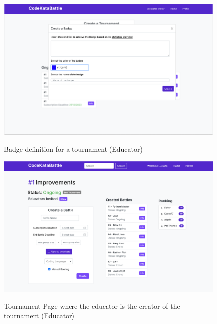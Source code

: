 \documentclass{Configuration_Files/Template}
\begin{document}
\begin{figure}[H]
\centering
\includegraphics[scale = 0.25]{Images/UI/MainPageEducator-1.png}\\
\caption{Badge definition for a tournament (Educator)}
\end{figure}

\begin{figure}[H]
\centering
\includegraphics[scale = 0.25]{Images/UI/TournamentPage_EducatorCreator.png}\\
\caption{Tournament Page where the educator is the creator of the tournament (Educator)}
\end{figure}
\end{document}

